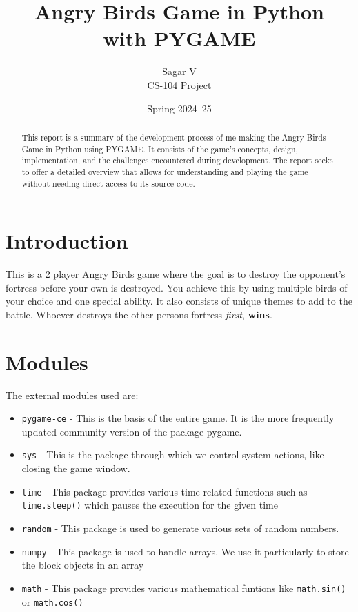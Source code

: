 \documentclass{article}
\title{Angry Birds Game in Python \\ with PYGAME}
\author{Sagar V \\ CS-104 Project}
\date{Spring 2024--25}
\begin{document}
\maketitle

\begin{abstract}
    This report is a summary of the development process of me making the Angry Birds Game in Python using PYGAME.
    It consists of the game's concepts, design, implementation, and the challenges encountered during development.
    The report seeks to offer a detailed overview that allows for understanding and playing the game without needing direct access to its source code.
\end{abstract}

\tableofcontents
\newpage

\section{Introduction}\label{sec:introduction}
This is a 2 player Angry Birds game where the goal is to destroy the opponent's fortress before your own is destroyed.
You achieve this by using multiple birds of your choice and one special ability.
It also consists of unique themes to add to the battle.
Whoever destroys the other persons fortress \emph{first}, \textbf{wins}.

\section{Modules}\label{sec:modules}
The external modules used are:
\begin{itemize}
    \item \texttt{pygame-ce} - This is the basis of the entire game. It is the more frequently updated community version of the package pygame.
    \item \texttt{sys} - This is the package through which we control system actions, like closing the game window.
    \item \texttt{time} - This package provides various time related functions such as \texttt{time.sleep()} which pauses the execution for the given time
    \item \texttt{random} - This package is used to generate various sets of random numbers.
    \item \texttt{numpy} - This package is used to handle arrays. We use it particularly to store the block objects in an array
    \item \texttt{math} - This package provides various mathematical funtions like \texttt{math.sin()} or \texttt{math.cos()}
    
\end{itemize}
\end{document}
